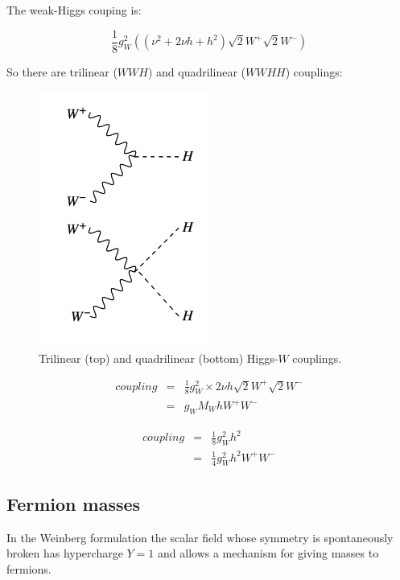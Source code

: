 The weak-Higgs couping is:

\[
  \frac{1}{8}g_W^2\left(\left(\nu^2 + 2\nu h + h^2\right)\sqrt{2}W^+\sqrt{2}W^-\right)
\]

So there are trilinear ($WWH$) and quadrilinear ($WWHH$) couplings:

\begin{figure}[!htb]
  \begin{center}
    \includegraphics[width=0.5\textwidth]{images/web_feynman/image_85.png}
    \caption[Trilinear and quadrilinear Higgs-$W$ couplings]{Trilinear (top) and quadrilinear (bottom) Higgs-$W$ couplings.}
    \label{fig:ch16_WHiggs}
  \end{center}
\end{figure}

\begin{eqnarray*}
  coupling & = & \frac{1}{8}g_W^2 \times 2\nu h \sqrt{2}W^+\sqrt{2}W^- \\
  & = & g_WM_WhW^+W^-
\end{eqnarray*}

\begin{eqnarray*}
  coupling & = & \frac{1}{8}g_W^2 h^2 \\
  & = & \frac{1}{4}g_W^2 h^2 W^+W^-
\end{eqnarray*}

\subsection{Fermion masses}

In the Weinberg formulation the scalar field whose symmetry is spontaneously broken has hypercharge $Y = 1$ and allows a mechanism for giving masses to fermions.

